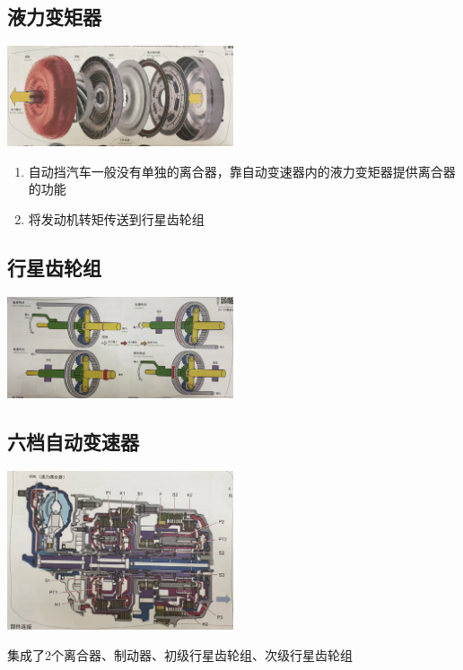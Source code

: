 	\subsection{液力变矩器}
		\begin{center}
			\includegraphics[width=0.5\textwidth]{3-16}
		\end{center}
		\begin{enumerate}[label*=\arabic*)]
			\item 自动挡汽车一般没有单独的离合器，靠自动变速器内的液力变矩器提供离合器的功能
			\item 将发动机转矩传送到行星齿轮组
		\end{enumerate}
	\subsection{行星齿轮组}
		\begin{center}
			\includegraphics[width=0.5\textwidth]{3-17}
		\end{center}
	\subsection{六档自动变速器}
		\begin{center}
			\includegraphics[width=0.5\textwidth]{3-18}
			
			集成了2个离合器、制动器、初级行星齿轮组、次级行星齿轮组
		\end{center}
